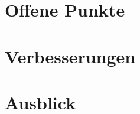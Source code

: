 %
\section{Offene Punkte}
\lipsum[1]
%
%
\section{Verbesserungen}
\lipsum[1-2]
%
\section{Ausblick}
\lipsum[1-2]